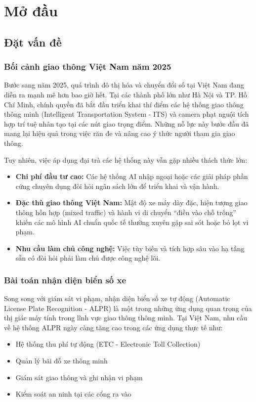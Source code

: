 ﻿\chapter{Mở đầu}
\label{ch:mo_dau}

\section{Đặt vấn đề}

\subsection{Bối cảnh giao thông Việt Nam năm 2025}
Bước sang năm 2025, quá trình đô thị hóa và chuyển đổi số tại Việt Nam đang diễn ra mạnh mẽ hơn bao giờ hết. Tại các thành phố lớn như Hà Nội và TP. Hồ Chí Minh, chính quyền đã bắt đầu triển khai thí điểm các hệ thống giao thông thông minh (Intelligent Transportation System - ITS) và camera phạt nguội tích hợp trí tuệ nhân tạo tại các nút giao trọng điểm. Những nỗ lực này bước đầu đã mang lại hiệu quả trong việc răn đe và nâng cao ý thức người tham gia giao thông.

Tuy nhiên, việc áp dụng đại trà các hệ thống này vẫn gặp nhiều thách thức lớn:
\begin{itemize}
    \item \textbf{Chi phí đầu tư cao:} Các hệ thống AI nhập ngoại hoặc các giải pháp phần cứng chuyên dụng đòi hỏi ngân sách lớn để triển khai và vận hành.
    \item \textbf{Đặc thù giao thông Việt Nam:} Mật độ xe máy dày đặc, hiện tượng giao thông hỗn hợp (mixed traffic) và hành vi di chuyển ``điền vào chỗ trống'' khiến các mô hình AI chuẩn quốc tế thường xuyên gặp sai sót hoặc bỏ lọt vi phạm.
    \item \textbf{Nhu cầu làm chủ công nghệ:} Việc tùy biến và tích hợp sâu vào hạ tầng sẵn có đòi hỏi phải làm chủ được công nghệ lõi.
\end{itemize}

\subsection{Bài toán nhận diện biển số xe}
Song song với giám sát vi phạm, nhận diện biển số xe tự động (Automatic License Plate Recognition - ALPR) là một trong những ứng dụng quan trọng của thị giác máy tính trong lĩnh vực giao thông thông minh. Tại Việt Nam, nhu cầu về hệ thống ALPR ngày càng tăng cao trong các ứng dụng thực tế như:
\begin{itemize}
    \item Hệ thống thu phí tự động (ETC - Electronic Toll Collection)
    \item Quản lý bãi đỗ xe thông minh
    \item Giám sát giao thông và ghi nhận vi phạm
    \item Kiểm soát an ninh tại các cổng ra vào
\end{itemize}


